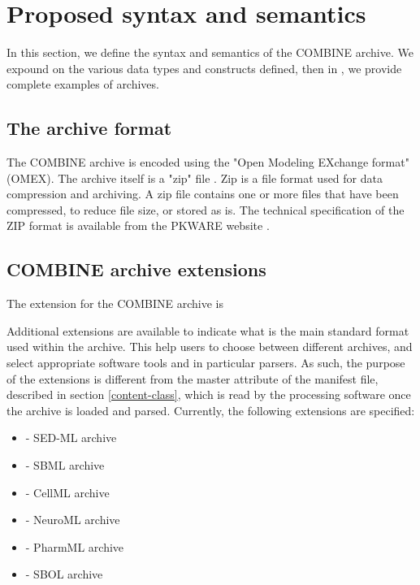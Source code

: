 
\section{Proposed syntax and semantics}
\label{syntax}

In this section, we define the syntax and semantics of the COMBINE 
archive. We expound on the various data types and constructs defined, 
then in , we provide complete examples of archives. 

\subsection{The archive format}

The COMBINE archive is encoded using the "{O}pen 
{M}odeling {EX}change format" (OMEX). The archive itself is a "zip" file \citep{zipFile}. Zip is a file format used for data compression and archiving. A zip file contains one or more files that have been compressed, to reduce file size, or stored as is. The technical specification of the ZIP format is available from the PKWARE website \citep{zipSpec}.

\subsection{COMBINE archive extensions}
\label{combine-archive-extensions}
The extension for the COMBINE archive is 

Additional extensions are available to indicate what is the main standard format used within the archive. This help users to choose between different archives, and select appropriate software tools and in particular parsers. As such, the purpose of the extensions is different from the master attribute of the manifest file, described in section \ref{content-class}, which is read by the processing software once the archive is loaded and parsed. Currently, the following extensions are specified:

\begin{itemize}
	\item { - SED-ML archive} \citep{Waltemath:2011}
	\item { - SBML archive} \citep{hucka:2003}
	\item { - CellML archive} \citep{Cuellar:2003}
	\item { - NeuroML archive} \citep{Gleeson:2010}
	\item { - PharmML archive} \citep{Moodie:2013}
        \item { - SBOL archive} \citep{Galdzicki:2014}
\end{itemize}

